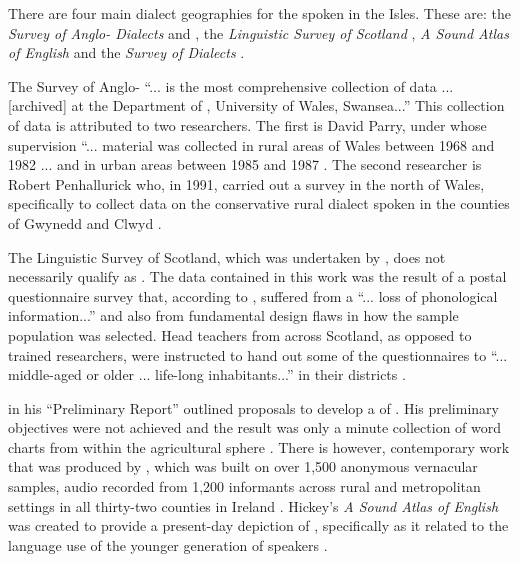 There are four main dialect geographies for the   spoken in the  Isles. These are: the \emph{Survey of Anglo- Dialects} \citep{Parry77, Parry79} and \citet{Penhallurick91}, the \emph{Linguistic Survey of Scotland} \citep{Mather75}, \emph{A Sound Atlas of  English} \citep{Hickey04} and the \emph{Survey of  Dialects} \citep{Orton6271}.

The Survey of Anglo-  ``... is the most comprehensive collection of   data ... [archived] at the Department of , University of Wales, Swansea...'' This collection of  data is attributed to two researchers. The first is David Parry, under whose supervision ``... material was collected in rural areas of Wales between 1968 and 1982 ... and in urban areas between 1985 and 1987 \citep[100]{Penhallurick04}. The second researcher is Robert Penhallurick who, in 1991, carried out a survey in the north of Wales, specifically to collect data on the conservative rural  dialect spoken in the counties of Gwynedd and Clwyd \citep{Penhallurick91}.

The Linguistic Survey of Scotland, which was undertaken by  \citet{Mather75}, does not necessarily qualify as . The data contained in this work was the result of a postal questionnaire survey that, according to  \citet[225]{Macaulay77}, suffered from a ``... loss of phonological information...'' and also from fundamental design flaws in how the sample population was selected. Head teachers from across Scotland, as opposed to trained researchers, were instructed to hand out some of the questionnaires to ``... middle-aged or older ... life-long inhabitants...'' in their districts \citep[14]{Macaulay77}.

\citet{Henry58} in his ``Preliminary Report'' outlined proposals to develop a  of  . His preliminary objectives were not achieved and the result was only a minute collection of word charts from within the agricultural sphere \citep{Corrigan10}. There is however, contemporary work that was produced by \citet{Hickey04}, which was built on over 1,500 anonymous vernacular samples, audio recorded from 1,200 informants across rural and metropolitan settings in all thirty-two counties in Ireland \citep{Corrigan10, Hickey04}. Hickey's \emph{A Sound Atlas of  English} was created to provide a present-day depiction of  , specifically as it related to the language use of the younger generation of   speakers \citep{Hickey04}.

